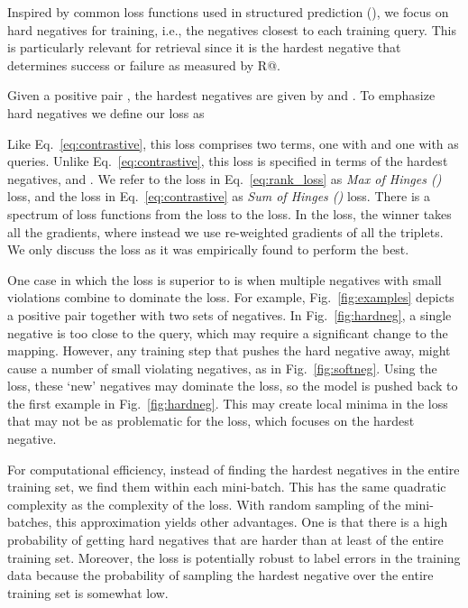 Inspired by common loss functions used in structured prediction 
(\cite{tsochantaridis2005large, yu2009learning, felzenszwalb2010object}), we 
focus on hard negatives for training, i.e., the negatives closest to each 
training query.  This is particularly relevant for retrieval since it is the 
hardest negative that determines success or failure as measured by R@.  




Given a positive pair , the hardest negatives are given by 
 and .
To emphasize hard negatives we define our loss as

Like Eq.~\ref{eq:contrastive}, this loss comprises two terms, 
one with  and one with  as queries.  Unlike Eq.~\ref{eq:contrastive}, 
this loss is specified in terms of the hardest negatives,   and 
. We refer to the loss in Eq.~\ref{eq:rank_loss} 
as {\em Max of Hinges (\MAX{})}\/ loss, and the loss in 
Eq.~\ref{eq:contrastive} as {\em Sum of Hinges (\SUM{})}\/ loss. There is 
a spectrum of loss functions from the \SUM{} loss to the \MAX{} loss. In the 
\MAX{} loss, the winner takes all the gradients, where instead we use 
re-weighted gradients of all the triplets. We only discuss the \MAX{} loss as 
it was empirically found to perform the best.

One case in which the \MAX{} loss is superior to \SUM{} is when multiple 
negatives with small violations combine to dominate the \SUM{} loss.  
For example, Fig.~\ref{fig:examples} depicts a positive pair
together with two sets of negatives.  In Fig.~\ref{fig:hardneg}, a 
single negative is too close to the query, which may require
a significant change to the mapping.  
However, any training step that pushes the hard negative 
away, might cause a number of small violating negatives, as 
in Fig.~\ref{fig:softneg}. Using the \SUM{} loss, these `new' negatives 
may dominate the loss, so the model is pushed back to the first 
example in Fig.~\ref{fig:hardneg}.  This may create local minima in the 
\SUM{} loss that may not be as problematic for the \MAX{} loss, which focuses
on the hardest negative.

For computational efficiency, instead of finding the hardest negatives in the 
entire training set, we find them within each mini-batch.  
This has the same quadratic 
complexity as the complexity of the \SUM{} loss.  With random 
sampling of the mini-batches, this approximation yields other advantages.  One is 
that there is a high probability of getting hard negatives that are harder than 
at least  of the entire training set.  Moreover, the loss is potentially 
robust to label errors in the training data because the probability of sampling 
the hardest negative over the entire training set is somewhat low.









